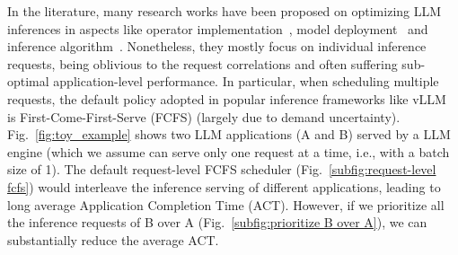 
In the literature, many research works have been proposed on optimizing LLM inferences in aspects like operator implementation~\cite{dao2022flashattention,hong2024flashdecoding}, model deployment~\cite{frantar2022gptq,kim2023squeezellm,kwon2023efficient,zhong_distserve_2024,agrawal_taming_2024} and inference algorithm~\cite{yu_orca_2022,miao2023specinfer,cai2024medusa,wu2023fast,sun2024llumnix}.
Nonetheless, they mostly focus on individual inference requests, being oblivious to the request correlations and often suffering sub-optimal application-level performance. 
In particular, when scheduling multiple requests, the default policy adopted in popular inference frameworks like vLLM~\cite{vllm} is First-Come-First-Serve (FCFS) (largely due to demand uncertainty). 
Fig.~\ref{fig:toy_example} shows two LLM applications (A and B) served by a LLM engine (which we assume can serve only one request at a time, i.e., with a batch size of 1).
The default request-level FCFS scheduler (Fig.~\ref{subfig:request-level fcfs}) would interleave the inference serving of different applications, leading to long average Application Completion Time (ACT).
However, if we prioritize all the inference requests of B over A (Fig.~\ref{subfig:prioritize B over A}), we can substantially reduce the average ACT. 

